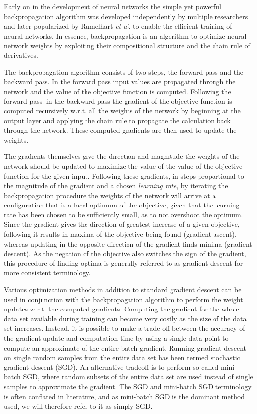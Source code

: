Early on in the development of neural networks the simple yet powerful backpropagation algorithm was developed independently by multiple researchers and later popularized by Rumelhart \textit{et al.} \cite{nature_backprop} to enable the efficient training of neural networks. In essence, backpropagation is an algorithm to optimize neural network weights by exploiting their compositional structure and the chain rule of derivatives.

The backpropagation algorithm consists of two steps, the forward pass and the backward pass. In the forward pass input values are propagated through the network and the value of the objective function is computed. Following the forward pass, in the backward pass the gradient of the objective function is computed recursively w.r.t. all the weights of the network by beginning at the output layer and applying the chain rule to propagate the calculation back through the network. These computed gradients are then used to update the weights.

The gradients themselves give the direction and magnitude the weights of the network should be updated to maximize the value of the value of the objective function for the given input. Following these gradients, in steps proportional to the magnitude of the gradient and a chosen \textit{learning rate}, by iterating the backpropagation procedure the weights of the network will arrive at a configuration that is a local optimum of the objective, given that the learning rate has been chosen to be sufficiently small, as to not overshoot the optimum. Since the gradient gives the direction of greatest increase of a given objective, following it results in maxima of the objective being found (gradient ascent), whereas updating in the opposite direction of the gradient finds minima (gradient descent). As the negation of the objective also switches the sign of the gradient, this procedure of finding optima is generally referred to as gradient descent for more consistent terminology.

Various optimization methods in addition to standard gradient descent can be used in conjunction with the backpropagation algorithm to perform the weight updates w.r.t. the computed gradients. Computing the gradient for the whole data set available during training can become very costly as the size of the data set increases. Instead, it is possible to make a trade off between the accuracy of the gradient update and computation time by using a single data point to compute an approximate of the entire batch gradient. Running gradient descent on single random samples from the entire data set has been termed stochastic gradient descent (SGD). An alternative tradeoff is to perform so called mini-batch SGD, where random subsets of the entire data set are used instead of single samples to approximate the gradient. The SGD and mini-batch SGD terminology is often conflated in literature, and as mini-batch SGD is the dominant method used, we will therefore refer to it as simply SGD.

